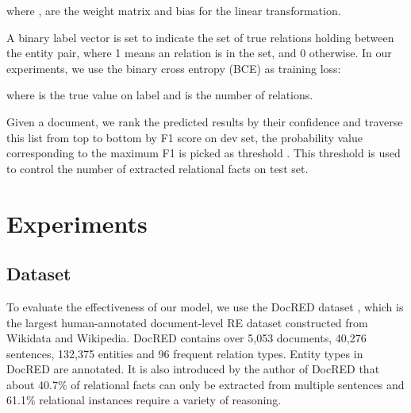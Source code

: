 \documentclass[runningheads]{llncs}
\begin{document}
where ,  are the weight matrix and bias for the linear transformation.

A binary label vector  is set to indicate the set of true relations holding between the entity pair, where 1 means an relation is in the set, and 0 otherwise. 
In our experiments, we use the binary cross entropy (BCE) as training loss:

where  is the true value on label  and  is the number of relations.

Given a document, we rank the predicted results by their confidence and traverse this list from top to bottom by F1 score on dev set, the probability value corresponding to the maximum F1 is picked as threshold .
This threshold is used to control the number of extracted relational facts on test set.

\section{Experiments}
\subsection{Dataset}

To evaluate the effectiveness of our model, we use the DocRED dataset \cite{Yao2019DocREDAL}, which is the largest human-annotated document-level RE dataset constructed from Wikidata and Wikipedia.
DocRED contains over 5,053 documents, 40,276 sentences, 132,375 entities and 96 frequent relation types.
Entity types in DocRED are annotated.
It is also introduced by the author of DocRED that about 40.7\% of relational facts can only be extracted from multiple sentences and 61.1\% relational instances require a variety of reasoning.
\end{document}
